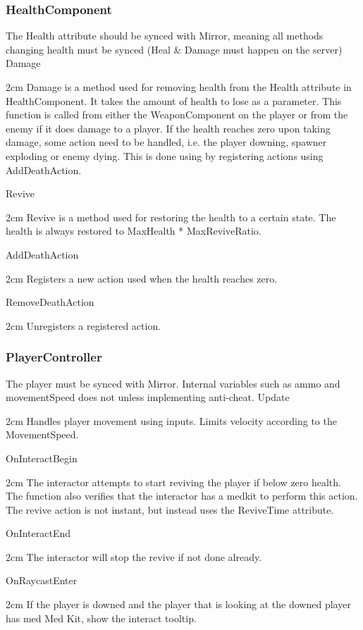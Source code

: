 \documentclass[11pt]{article}
\newenvironment{indentall}{\begin{adjustwidth}{2cm}{}}{\end{adjustwidth}}
\begin{document}
\subsubsection{HealthComponent}
The Health attribute should be synced with Mirror, meaning all methods changing health must be synced (Heal \& Damage must happen on the server)
\newline 
\newline Damage
\begin{indentall}
Damage is a method used for removing health from the Health attribute in HealthComponent. It takes the amount of health to lose as a parameter. This function is called from either the WeaponComponent on the player or from the enemy if it does damage to a player. If the health reaches zero upon taking damage, some action need to be handled, i.e. the player downing, spawner exploding or enemy dying. This is done using by registering actions using AddDeathAction.
\end{indentall}
Revive
\begin{indentall}
Revive is a method used for restoring the health to a certain state. The health is always restored to MaxHealth * MaxReviveRatio.
\end{indentall}
AddDeathAction
\begin{indentall}
Registers a new action used when the health reaches zero.
\end{indentall}
RemoveDeathAction
\begin{indentall}
Unregisters a registered action.
\end{indentall}

\subsubsection{PlayerController}
The player must be synced with Mirror. Internal variables such as ammo and movementSpeed does not unless implementing anti-cheat.
\newline 
\newline Update
\begin{indentall}
Handles player movement using inputs. Limits velocity according to the MovementSpeed. 
\end{indentall}
OnInteractBegin
\begin{indentall}
The interactor attempts to start reviving the player if below zero health. The function also verifies that the interactor has a medkit to perform this action. The revive action is not instant, but instead uses the ReviveTime attribute.
\end{indentall}
OnInteractEnd
\begin{indentall}
The interactor will stop the revive if not done already.
\end{indentall}
OnRaycastEnter
\begin{indentall}
If the player is downed and the player that is looking at the downed player has med Med Kit, show the interact tooltip.
\end{indentall}
\end{document}
